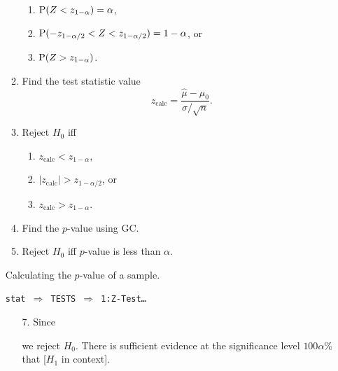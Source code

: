 \documentclass[../Notes.tex]{subfiles}
\begin{document}
\begin{stbox}{}
\begin{itemize}
\begin{minipage}[t]{0.45\textwidth}
\begin{enumerate}
\begin{enumerate}
            \item \(\operatorname{P}(Z<z_{1-\alpha})=\alpha\), 
            \item \(\operatorname{P}(-z_{1-\alpha/2}<Z<z_{1-\alpha/2})=1-\alpha\), or
            \item \(\operatorname{P}(Z>z_{1-\alpha})\).
          \end{enumerate}
          \item Find the test statistic value 
          \[z_\text{calc}=\frac{\hat{\mu}-\mu_0}{\sigma/\sqrt{n}}.\]
          \item Reject \(H_0\) iff 
          \begin{enumerate}
            \item \(z_\text{calc}<z_{1-\alpha}\),
            \item \(\lvert z_\text{calc} \rvert>z_{1-\alpha/2}\), or
            \item \(z_\text{calc}>z_{1-\alpha}\).
          \end{enumerate}
        \end{enumerate}
      \end{minipage}
      \begin{minipage}[t]{0.45\textwidth}
        \begin{enumerate}
          \setcounter{enumi}{3}
          \item Find the \(p\)-value using GC.
          \item Reject \(H_0\) iff \(p\)-value is less than \(\alpha\).
        \end{enumerate}
        \vfill
        \begin{flushright}
          \begin{minipage}{0.8\textwidth}
            \begin{GCSkills}{}
              Calculating the \(p\)-value of a sample.
              \begin{center}
                \texttt{stat \(\Longrightarrow\) TESTS \(\Longrightarrow\) 1:Z-Test\dots}
              \end{center}
            \end{GCSkills}
          \end{minipage}
        \end{flushright}
      \end{minipage}
      \begin{enumerate}
        \item[7.] Since\quad
        we reject \(H_0\). There is sufficient evidence at the significance level \(100\alpha\%\) that [\(H_1\) in context].


\end{enumerate}
\end{itemize}
\end{stbox}
\end{document}
